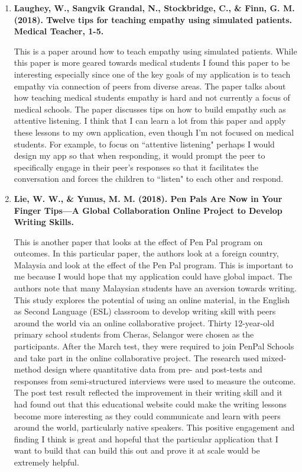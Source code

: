 \documentclass[12pt, final]{article}
\begin{document}
\begin{enumerate}
\item \textbf{Laughey, W., Sangvik Grandal, N., Stockbridge, C., \& Finn, G. M. (2018). Twelve tips for teaching empathy using simulated patients. Medical Teacher, 1-5.}

This is a paper around how to teach empathy using simulated patients. While this paper is more geared towards medical students I found this paper to be interesting especially since one of the key goals of my application is to teach empathy via connection of peers from diverse areas. The paper talks about how teaching medical students empathy is hard and not currently a focus of medical schools. The paper discusses tips on how to build empathy such as attentive listening. I think that I can learn a lot from this paper and apply these lessons to my own application, even though I'm not focused on medical students. For example, to focus on ``attentive listening" perhaps I would design my app so that when responding, it would prompt the peer to specifically engage in their peer's responses so that it facilitates the conversation and forces the children to ``listen" to each other and respond. 

\item \textbf{Lie, W. W., \& Yunus, M. M. (2018). Pen Pals Are Now in Your Finger Tips—A Global Collaboration Online Project to Develop Writing Skills.}

This is another paper that looks at the effect of Pen Pal program on outcomes. In this particular paper, the authors look at a foreign country, Malaysia and look at the effect of the Pen Pal program. This is important to me because I would hope that my application could have global impact. The authors note that many Malaysian students have an aversion towards writing. This study explores the potential of using an online material, in the English as Second Language (ESL) classroom to develop writing skill with peers around the world via an online collaborative project. Thirty 12-year-old primary school students from Cheras, Selangor were chosen as the participants. After the March test, they were required to join PenPal Schools and take part in the online collaborative project.  The research used mixed-method design where quantitative data from pre- and post-tests and responses from semi-structured interviews were used to measure the outcome. The post test result reflected the improvement in their writing skill and it had found out that this educational website could make the writing lessons become more interesting as they could communicate and learn with peers around the world, particularly native speakers. This positive engagement and finding I think is great and hopeful that the particular application that I want to build that can build this out and prove it at scale would be extremely helpful. 


\end{enumerate}
\end{document}
